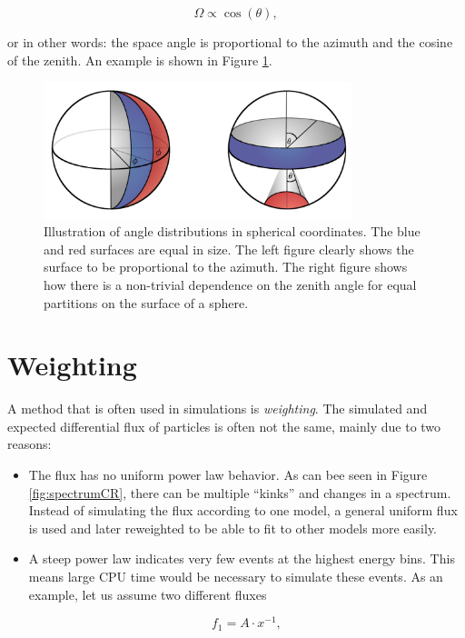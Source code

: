 \begin{appendices}
\begin{equation}
\Omega \propto \cos(\theta),
\end{equation}

\noindent or in other words: the space angle is proportional to the azimuth and the cosine of the zenith. An example is shown in Figure \ref{fig:spaceangle}.

\begin{figure}
\centering
\includegraphics[width = 0.8\textwidth]{appendix/img/spaceangle.png}
\caption{Illustration of angle distributions in spherical coordinates. The blue and red surfaces are equal in size. The left figure clearly shows the surface to be proportional to the azimuth. The right figure shows how there is a non-trivial dependence on the zenith angle for equal partitions on the surface of a sphere.}
\label{fig:spaceangle}
\end{figure}

\section{Weighting}
\label{sec:weighting}
A method that is often used in simulations is \textit{weighting}. The simulated and expected differential flux of particles is often not the same, mainly due to two reasons:
\vspace{2mm}
\begin{itemize}
\item The flux has no uniform power law behavior. As can bee seen in Figure \ref{fig:spectrumCR}, there can be multiple ``kinks'' and changes in a spectrum. Instead of simulating the flux according to one model, a general uniform flux is used and later reweighted to be able to fit to other models more easily.
\item A steep power law indicates very few events at the highest energy bins. This means large CPU time would be necessary to simulate these events. As an example, let us assume two different fluxes

\begin{equation}
f_1 = A \cdot x^{-1},
\end{equation}


\end{itemize}
\end{appendices}
